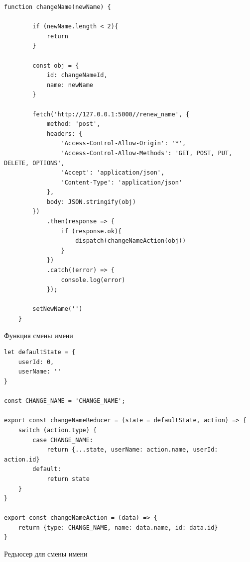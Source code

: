 \documentclass[14pt,final]{report}
\begin{document}
\begin{listing}[!h]
\begin{verbatim}
function changeName(newName) {

        if (newName.length < 2){
            return
        }

        const obj = {
            id: changeNameId,
            name: newName
        }

        fetch('http://127.0.0.1:5000//renew_name', {
            method: 'post',
            headers: {
                'Access-Control-Allow-Origin': '*',
                'Access-Control-Allow-Methods': 'GET, POST, PUT, DELETE, OPTIONS',
                'Accept': 'application/json',
                'Content-Type': 'application/json'
            },
            body: JSON.stringify(obj)
        })
            .then(response => {
                if (response.ok){
                    dispatch(changeNameAction(obj))
                }
            })
            .catch((error) => {
                console.log(error)
            });

        setNewName('')
    }
\end{verbatim}
\caption{Функция смены имени}
\label{changeName}
\end{listing}

\begin{listing}[!h]
\begin{verbatim}
let defaultState = {
    userId: 0,
    userName: ''
}

const CHANGE_NAME = 'CHANGE_NAME';

export const changeNameReducer = (state = defaultState, action) => {
    switch (action.type) {
        case CHANGE_NAME:
            return {...state, userName: action.name, userId: action.id}
        default:
            return state
    }
}

export const changeNameAction = (data) => {
    return {type: CHANGE_NAME, name: data.name, id: data.id}
}
\end{verbatim}
\caption{Редьюсер для смены имени}
\label{changeNameReducer}
\end{listing}
\end{document}

